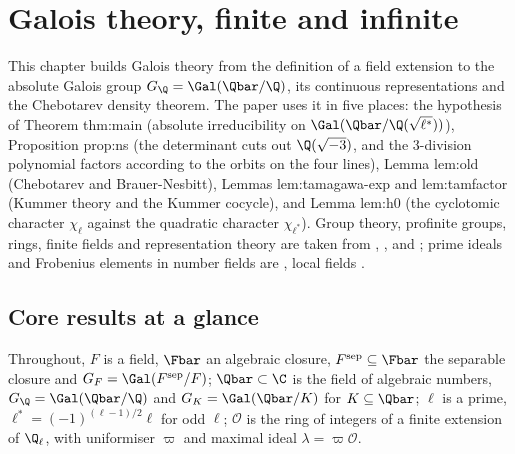 \chapter{Galois theory, finite and infinite}\label{ch:galois}

This chapter builds Galois theory from the definition of a field extension to the absolute Galois group $G_\Q=\Gal(\Qbar/\Q)$, its
continuous representations and the Chebotarev density theorem. The paper uses it in five places: the hypothesis of Theorem thm:main
(absolute irreducibility on $\Gal(\Qbar/\Q(\sqrt{\ell^*}))$), Proposition prop:ns (the determinant cuts out $\Q(\sqrt{-3})$, and the
$3$-division polynomial factors according to the orbits on the four lines), Lemma lem:old (Chebotarev and Brauer-Nesbitt), Lemmas
lem:tamagawa-exp and lem:tamfactor (Kummer theory and the Kummer cocycle), and Lemma lem:h0 (the cyclotomic character $\chi_\ell$ against
the quadratic character $\chi_{\ell^*}$). Group theory, profinite groups, rings, finite fields and representation theory are taken from
, ,  and ; prime ideals and Frobenius elements in number fields are
, local fields .

\section*{Core results at a glance}

Throughout, $F$ is a field, $\Fbar$ an algebraic closure, $F^{\mathrm{sep}}\subseteq\Fbar$ the separable closure and $G_F=\Gal(F^{\mathrm{sep}}/F)$;
$\Qbar\subset\C$ is the field of algebraic numbers, $G_\Q=\Gal(\Qbar/\Q)$ and $G_K=\Gal(\Qbar/K)$ for $K\subseteq\Qbar$; $\ell$ is a prime,
$\ell^*=(-1)^{(\ell-1)/2}\ell$ for odd $\ell$; $\mathcal{O}$ is the ring of integers of a finite extension of $\Q_\ell$, with uniformiser $\varpi$
and maximal ideal $\lambda=\varpi\mathcal{O}$.

